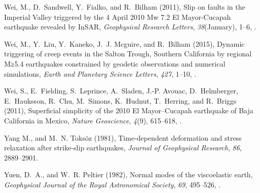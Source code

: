 \documentclass[draft,linenumbers]{AGUJournal}
\begin{document}
\begin{thebibliography}{52}
Wei, M., D.~Sandwell, Y.~Fialko, and R.~Bilham (2011{}), {Slip on
  faults in the Imperial Valley triggered by the 4 April 2010 Mw 7.2 El
  Mayor-Cucapah earthquake revealed by InSAR}, \textit{Geophysical Research
  Letters}, \textit{38}(January), 1--6, .

Wei, M., Y.~Liu, Y.~Kaneko, J.~J. Mcguire, and R.~Bilham (2015), {Dynamic
  triggering of creep events in the Salton Trough, Southern California by
  regional M≥5.4 earthquakes constrained by geodetic observations and
  numerical simulations}, \textit{Earth and Planetary Science Letters},
  \textit{427}, 1--10, .

Wei, S., E.~Fielding, S.~Leprince, A.~Sladen, J.-P. Avouac, D.~Helmberger,
  E.~Hauksson, R.~Chu, M.~Simons, K.~Hudnut, T.~Herring, and R.~Briggs
  (2011{}), {Superficial simplicity of the 2010 El Mayor–Cucapah
  earthquake of Baja California in Mexico}, \textit{Nature Geoscience},
  \textit{4}(9), 615--618, .

Yang M., and M.~N. Toks\"oz (1981), {Time-dependent deformation and stress relaxation after strike-slip earthquakes}, \textit{Journal of Geophysical Research}, \textit{86}, 2889--2901.


Yuen, D.~A., and W.~R. Peltier (1982), {Normal modes of the viscoelastic
  earth}, \textit{Geophysical Journal of the Royal Astronomical Society},
  \textit{69}, 495--526, .

\end{thebibliography}



\listofchanges
\end{document}

